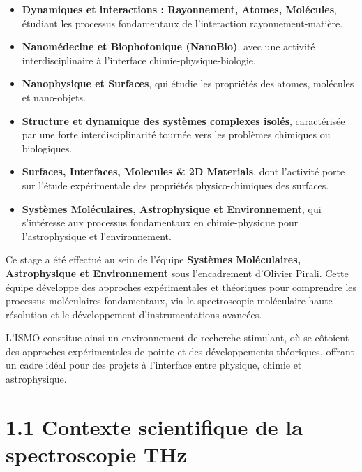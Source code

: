 \begin{itemize}
    \item \textbf{Dynamiques et interactions : Rayonnement, Atomes, Molécules}, étudiant les processus fondamentaux de l'interaction rayonnement-matière.
    
    \item \textbf{Nanomédecine et Biophotonique (NanoBio)}, avec une activité interdisciplinaire à l'interface chimie-physique-biologie.
    
    \item \textbf{Nanophysique et Surfaces}, qui étudie les propriétés des atomes, molécules et nano-objets.
    
    \item \textbf{Structure et dynamique des systèmes complexes isolés}, caractérisée par une forte interdisciplinarité tournée vers les problèmes chimiques ou biologiques.
    
    \item \textbf{Surfaces, Interfaces, Molecules \& 2D Materials}, dont l'activité porte sur l'étude expérimentale des propriétés physico-chimiques des surfaces.
    
    \item \textbf{Systèmes Moléculaires, Astrophysique et Environnement}, qui s'intéresse aux processus fondamentaux en chimie-physique pour l'astrophysique et l'environnement.
\end{itemize}

Ce stage a été effectué au sein de l'équipe \textbf{Systèmes Moléculaires, Astrophysique et Environnement} sous l'encadrement d'Olivier Pirali. Cette équipe développe des approches expérimentales et théoriques pour comprendre les processus moléculaires fondamentaux, via la spectroscopie moléculaire haute résolution et le développement d'instrumentations avancées.

L'ISMO constitue ainsi un environnement de recherche stimulant, où se côtoient des approches expérimentales de pointe et des développements théoriques, offrant un cadre idéal pour des projets à l'interface entre physique, chimie et astrophysique.

\section*{1.1 Contexte scientifique de la spectroscopie THz}

